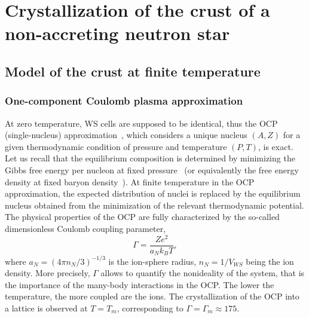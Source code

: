 \chapter{Crystallization of the crust of a non-accreting neutron star}


\minitoc\newpage

\section{Model of the crust at finite temperature}


\subsection{One-component Coulomb plasma approximation}

At zero temperature, WS cells are supposed to be identical, thus the OCP  
(single-nucleus) approximation~\cite{Baus1980}, which considers a unique 
nucleus $(A,Z)$ for a given thermodynamic condition of pressure and temperature 
$(P,T)$, is exact. Let us recall that the equilibrium composition is 
determined by minimizing the Gibbs free energy per nucleon at fixed
pressure~\cite{Fantina2020} 
(or equivalently the free energy density at fixed baryon
density~\cite{Lattimer1991,Gulminelli2015,Carreau2019}).
At finite temperature in the OCP approximation, the expected distribution of 
nuclei is replaced by the equilibrium nucleus obtained from the minimization of 
the relevant thermodynamic potential.
The physical properties of the OCP are fully characterized by the so-called 
dimensionless Coulomb coupling parameter,
%
\begin{equation}
  \Gamma = \frac{Ze^2}{a_N k_B T},\label{eq:gamma}
\end{equation}
%
where $a_N=(4\pi n_N/3)^{-1/3}$ is the ion-sphere radius, $n_N=1/V_{WS}$ being 
the ion density.
More precisely, $\Gamma$ allows to quantify the nonideality of the system, that
is the importance of the many-body interactions in the OCP. The lower the
temperature, the more coupled are the ions. The crystallization of the OCP into 
a lattice is observed at $T=T_m$, corresponding to 
$\Gamma = \Gamma_m \approx 175$.

